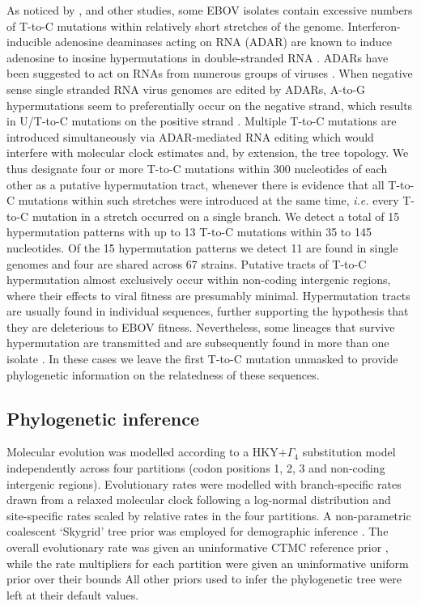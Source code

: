 \documentclass[11pt,oneside,letterpaper]{article}
\begin{document}
As noticed by \citet{tong_2015}, \citet{park_2015} and other studies, some EBOV isolates contain excessive numbers of T-to-C mutations within relatively short stretches of the genome. 
Interferon-inducible adenosine deaminases acting on RNA (ADAR) are known to induce adenosine to inosine hypermutations in double-stranded RNA \citep{bass_1988}.
ADARs have been suggested to act on RNAs from numerous groups of viruses \citep{gelinas_2011}. 
When negative sense single stranded RNA virus genomes are edited by ADARs, A-to-G hypermutations seem to preferentially occur on the negative strand, which results in U/T-to-C mutations on the positive strand \citep{cattaneo_1988,rueda_1994,carpenter_2009}. 
Multiple T-to-C mutations are introduced simultaneously via ADAR-mediated RNA editing which would interfere with molecular clock estimates and, by extension, the tree topology.
We thus designate four or more T-to-C mutations within 300 nucleotides of each other as a putative hypermutation tract, whenever there is evidence that all T-to-C mutations within such stretches were introduced at the same time, \textit{i.e.} every T-to-C mutation in a stretch occurred on a single branch.
We detect a total of 15 hypermutation patterns with up to 13 T-to-C mutations within 35 to 145 nucleotides.
Of the 15 hypermutation patterns we detect 11 are found in single genomes and four are shared across 67 strains.
Putative tracts of T-to-C hypermutation almost exclusively occur within non-coding intergenic regions, where their effects to viral fitness are presumably minimal. 
Hypermutation tracts are usually found in individual sequences, further supporting the hypothesis that they are deleterious to EBOV fitness. 
Nevertheless, some lineages that survive hypermutation are transmitted and are subsequently found in more than one isolate \citep{smits_2015}. 
In these cases we leave the first T-to-C mutation unmasked to provide phylogenetic information on the relatedness of these sequences.

\subsection*{Phylogenetic inference}
Molecular evolution was modelled according to a HKY$+\Gamma_{4}$ \citep{hky_1985,yang_1994} substitution model independently across four partitions (codon positions 1, 2, 3 and non-coding intergenic regions).
Evolutionary rates were modelled with branch-specific rates drawn from a relaxed molecular clock following a log-normal distribution \citep{drummond_2006} and site-specific rates scaled by relative rates in the four partitions.
A non-parametric coalescent `Skygrid' tree prior was employed for demographic inference \citep{gill_2012}.
The overall evolutionary rate was given an uninformative CTMC reference prior \citep{ferreira_2008}, while the rate multipliers for each partition were given an uninformative uniform prior over their bounds
All other priors used to infer the phylogenetic tree were left at their default values.
\end{document}
